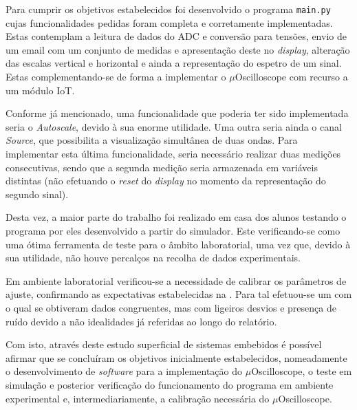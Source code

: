 Para cumprir os objetivos estabelecidos foi desenvolvido o programa \texttt{main.py} cujas funcionalidades pedidas foram completa e corretamente implementadas. Estas contemplam a leitura de dados do ADC e conversão para tensões, envio de um email com um conjunto de medidas e apresentação deste no \textit{display}, alteração das escalas vertical e horizontal e ainda a representação do espetro de um sinal. Estas complementando-se de forma a implementar o $\mu$Oscilloscope com recurso a um módulo IoT.

Conforme já mencionado, uma funcionalidade que poderia ter sido implementada seria o \textit{Autoscale}, devido à sua enorme utilidade. Uma outra seria ainda o canal \textit{Source}, que possibilita a visualização simultânea de duas ondas. Para implementar esta última funcionalidade, seria necessário realizar duas medições consecutivas, sendo que a segunda medição seria armazenada em variáveis distintas (não efetuando o \textit{reset} do \textit{display} no momento da representação do segundo sinal).\newline

Desta vez, a maior parte do trabalho foi realizado em casa dos alunos testando o programa por eles desenvolvido a partir do simulador. Este verificando-se como uma ótima ferramenta de teste para o âmbito laboratorial, uma vez que, devido à sua utilidade, não houve percalços na recolha de dados experimentais.

Em ambiente laboratorial verificou-se a necessidade de calibrar os parâmetros de ajuste, confirmando as expectativas estabelecidas na . Para tal efetuou-se um  com o qual se obtiveram dados congruentes, mas com ligeiros desvios e presença de ruído devido a não idealidades já referidas ao longo do relatório. \newline

Com isto, através deste estudo superficial de sistemas embebidos é possível afirmar que se concluíram os objetivos inicialmente estabelecidos, nomeadamente o desenvolvimento de \textit{software} para a implementação do $\mu$Oscilloscope, o teste em simulação e posterior verificação do funcionamento do programa em ambiente experimental e, intermediariamente, a calibração necessária do $\mu$Oscilloscope.